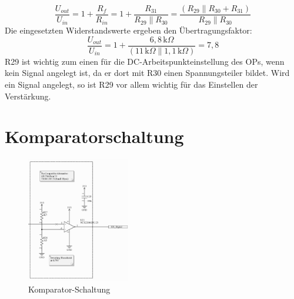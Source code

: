 \begin{equation}
    \frac{U_{out}}{U_{in}} = 1 + \frac{R_f}{R_{in}} = 1 + \frac{R_{31}}{R_{29}\parallel R_{30}}=\frac{(R_{29} \parallel R_{30}+R_{31})}{R_{29}\parallel R_{30}}
\end{equation}
Die eingesetzten Widerstandswerte ergeben den Übertragungsfaktor:
\begin{equation}
    \frac{U_{out}}{U_{in}} = 1 + \frac{6,8\,\mathrm{k}\Omega}{(11\,\mathrm{k}\Omega \parallel 1,1\,\mathrm{k}\Omega)} = 7,8
\end{equation}
R29 ist wichtig zum einen für die DC-Arbeitspunkteinstellung des OPs, wenn kein Signal angelegt ist, da er dort mit R30 einen Spannungsteiler bildet.
Wird ein Signal angelegt, so ist R29 vor allem wichtig für das Einstellen der Verstärkung.

\section{Komparatorschaltung} %

\begin{figure}[H]
    \centering
    \includegraphics[width=0.4\textwidth]{Pictures/Komparator.png}
    \caption{Komparator-Schaltung}
    \label{fig:opamp_schaltung}
\end{figure}

